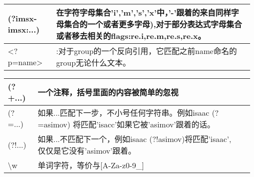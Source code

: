 \begin{table}
\begin{tabular}{|p{2cm}|p{8cm}|}
\hline
(?imsx-imsx:...)&在字符字母集合'i','m','s','x'中，'-'跟着的来自同样字母集合的一个或者更多字母),对于部分表达式字母集合或者移去相关的flags:re.i,re.m,re.s,re.x。\\
\hline
<?p=name>&:对于group的一个反向引用，它匹配之前name命名的group无论什么文本。\\
\hline
\end{tabular}
\end{table}
\begin{tabular}{|p{2cm}|p{4cm}|p{4cm}|}
\hline
(?+...)&一个注释，括号里面的内容被简单的忽视&\\
\hline
(?=...)&如果...匹配下一步，不小号任何字符串。例如isaac (?=asimov) 将匹配'isacc'如果它被'asimov'跟着的话。&\\
\hline
(?!...)&如果...不匹配下一个，例如isaac (?!asimov)将匹配'isaac',仅仅是它没有'asimov'跟着。&\\
\hline
\textbackslash w&单词字符，等价与[A-Za-z0-9\_]&\\
\hline
\end{tabular}

